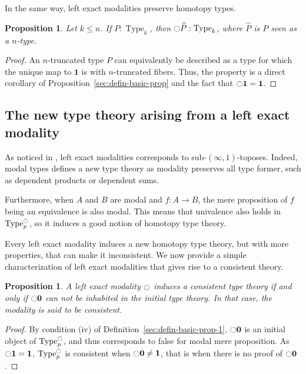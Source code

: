 \documentclass[conference]{IEEEtran}
\newtheorem{prop}[thm]{Proposition}
\newcommand{\mynote}[2]{
    \fbox{\bfseries\sffamily\scriptsize#1}
    {\small$\blacktriangleright$\textsf{\emph{#2}}$\blacktriangleleft$}~}
\newcommand\nt[1]{\mynote{NT}{#1}}
\DeclareMathOperator{\Type}{Type}
\newcommand{\modal}{\ensuremath{\ocircle}}
\newcommand \zero {\mathbf{0}}
\newcommand \one {\mathbf{1}}
\begin{document}
In the same way, left exact modalities preserve homotopy types.
\begin{prop}
  Let $k \leq n$.
  If $P:\Type_k$, then $\modal \widehat P : \Type_k$, where $\widehat P$
  is $P$ seen as a $n$-type.
\end{prop}
\begin{proof}
  An $n$-truncated type $P$ can equivalently be described as a type for
  which the unique map to $\one$ is with $n$-truncated fibers. Thus, the
  property is a direct corollary of
  Proposition~\ref{sec:defin-basic-prop} and the fact that $\modal \one =
  \one$.
\end{proof}

\subsection{The new type theory arising from a left exact modality}
\label{sec:new-type-theory}

As noticed in \cite{hottbook}, left exact modalities corresponds 
to sub-$(\infty,1)$-toposes. Indeed, modal types defines a new type
theory as modality preserves all type former, such as dependent
products or dependent sums.

Furthermore, when $A$ and $B$ are modal and $f : A \to B$, the mere
proposition of $f$ being an equivalence is also modal. This means that
univalence also holds in $\Type^\modal_p$, so it induces a good notion
of homotopy type theory.

Every left exact modality induces a new homotopy type theory, but with more
properties, that can make it inconsistent. We now provide a simple
characterization of left exact modalities that gives rise to a
consistent theory.

\begin{prop}\label{prop:consistent}
  A left exact modality $\modal$ induces a consistent type theory if
  and only if $\modal \zero$ can not be inhabited in the initial type
  theory. In that case, the modality is said to be consistent.
\end{prop}
\begin{proof}
  By condition (iv) of Definition~\ref{sec:defin-basic-prop-1},
  $\modal \zero$ is an initial object of $\Type^\modal_p$, and thus
  corresponds to false for modal mere proposition.
  As $\modal \one = \one$, $\Type^\modal_p$ is consistent when
  $\modal \zero \neq \one$, that is when there is no proof of
  $\modal \zero$.
\end{proof}
\end{document}

